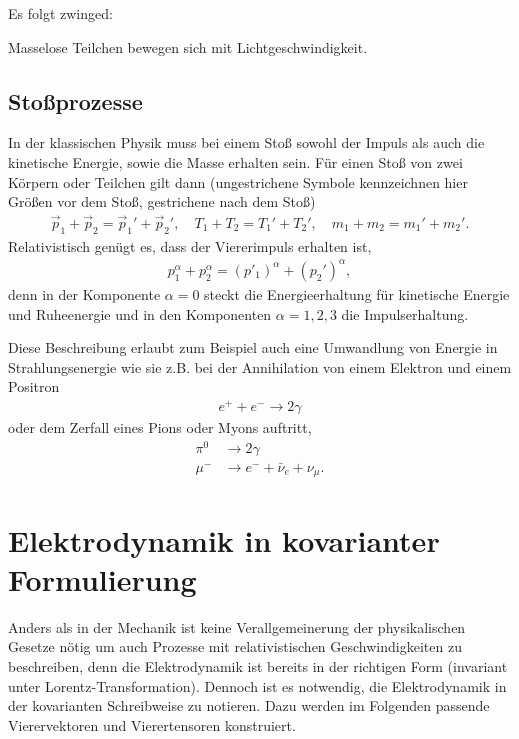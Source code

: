 Es folgt zwinged:
\begin{formal}
    Masselose Teilchen bewegen sich mit Lichtgeschwindigkeit\footnotemark.
\end{formal}



\subsection{Stoßprozesse}


In der klassischen Physik muss bei einem Stoß sowohl der Impuls als auch die kinetische Energie, sowie die Masse erhalten sein.
Für einen Stoß von zwei Körpern oder Teilchen gilt dann (ungestrichene Symbole kennzeichnen hier Größen vor dem Stoß, gestrichene nach dem Stoß)
\begin{align*}
    \vec p_1 +\vec p_2 = \vec p_1'+\vec p_2', \quad T_1+T_2=T_1'+T_2', \quad m_1+m_2=m_1'+m_2'.
\end{align*}
Relativistisch genügt es, dass der Viererimpuls erhalten ist,
\begin{align*}
    p_1^\alpha+p_2^\alpha =(p'_1)^\alpha + (p_2')^\alpha,
\end{align*}
denn in der Komponente $\alpha=0$ steckt die Energieerhaltung für kinetische Energie und Ruheenergie
und in den Komponenten $\alpha=1,2,3$ die Impulserhaltung.

Diese Beschreibung erlaubt zum Beispiel auch eine Umwandlung von Energie in Strahlungsenergie wie sie z.B. bei der Annihilation von einem Elektron und einem Positron
\begin{align*}
    e^+ +e^- \rightarrow2\gamma
\end{align*}
oder dem Zerfall eines Pions oder Myons auftritt,
\begin{align*}
    \pi^0 & \rightarrow2\gamma                     \\
    \mu^- & \rightarrow e^- + \bar{\nu}_e+\nu_\mu.
\end{align*}






\section{Elektrodynamik in kovarianter Formulierung}

Anders als in der Mechanik ist keine Verallgemeinerung der physikalischen Gesetze nötig um auch Prozesse mit relativistischen Geschwindigkeiten zu beschreiben, denn die Elektrodynamik ist bereits in der richtigen Form (invariant unter Lorentz-Transformation).
Dennoch ist es notwendig, die Elektrodynamik in der kovarianten Schreibweise zu notieren.
Dazu werden im Folgenden passende Vierervektoren und Vierertensoren konstruiert.



